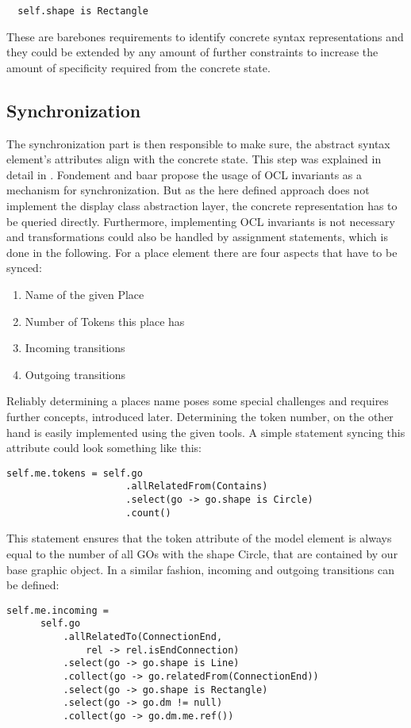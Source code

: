 \begin{lstlisting}
  self.shape is Rectangle
\end{lstlisting}

These are barebones requirements to identify concrete syntax representations and they could be extended by any amount of further constraints to increase the amount of specificity required from the concrete state.

\subsection{Synchronization}
The synchronization part is then responsible to make sure, the abstract syntax element's attributes align with the concrete state. This step was explained in detail in \cite{fondement_making_2005}. Fondement and baar propose the usage of OCL invariants as a mechanism for synchronization. But as the here defined approach does not implement the display class abstraction layer, the concrete representation has to be queried directly. Furthermore, implementing OCL invariants is not necessary and transformations could also be handled by assignment statements, which is done in the following. For a place element there are four aspects that have to be synced:
\begin{enumerate}
  \item Name of the given Place
  \item Number of Tokens this place has
  \item Incoming transitions
  \item Outgoing transitions
\end{enumerate} 

Reliably determining a places name poses some special challenges and requires further concepts, introduced later. Determining the token number, on the other hand is easily implemented using the given tools. A simple statement syncing this attribute could look something like this: 
\begin{lstlisting}[language=OCL]
self.me.tokens = self.go
                     .allRelatedFrom(Contains)
                     .select(go -> go.shape is Circle)
                     .count()
\end{lstlisting}

This statement ensures that the token attribute of the model element is always equal to the number of all GOs with the shape Circle, that are contained by our base graphic object. In a similar fashion, incoming and outgoing transitions can be defined:
\begin{lstlisting}[language=OCL]
self.me.incoming = 
      self.go
          .allRelatedTo(ConnectionEnd,
              rel -> rel.isEndConnection)
          .select(go -> go.shape is Line)
          .collect(go -> go.relatedFrom(ConnectionEnd))
          .select(go -> go.shape is Rectangle)
          .select(go -> go.dm != null)
          .collect(go -> go.dm.me.ref())
\end{lstlisting}

